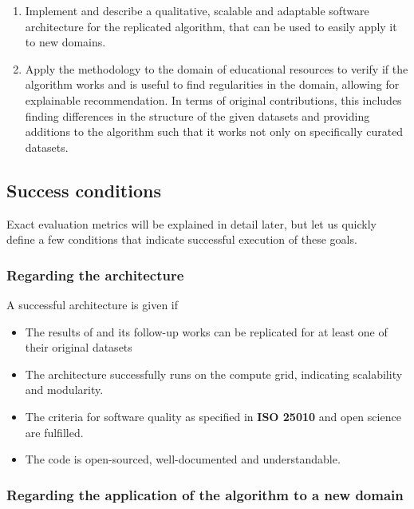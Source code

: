 \begin{enumerate}
    \item Implement and describe a qualitative, scalable and adaptable software architecture for the replicated algorithm, that can be used to easily apply it to new domains.
    \item Apply the methodology to the domain of educational resources to verify if the algorithm works and is useful to find regularities in the domain, allowing for explainable recommendation. In terms of original contributions, this includes finding differences in the structure of the given datasets and providing additions to the algorithm such that it works not only on specifically curated datasets.
\end{enumerate}

\subsection{Success conditions}
\label{sec:success_conds}

Exact evaluation metrics will be explained in detail later, but let us quickly define a few conditions that indicate successful execution of these goals.

\subsubsection*{Regarding the architecture}

A successful architecture is given if 

\begin{itemize}
    \item The results of \cite{Derrac2015} and its follow-up works \cite{Ager2018,Alshaikh2020} can be replicated for at least one of their original datasets
    \item The architecture successfully runs on the compute grid, indicating scalability and modularity.
    \item The criteria for software quality as specified in \textbf{ISO 25010} and open science are fulfilled.
    \item The code is open-sourced, well-documented and understandable.
\end{itemize}

\subsubsection*{Regarding the application of the algorithm to a new domain}

